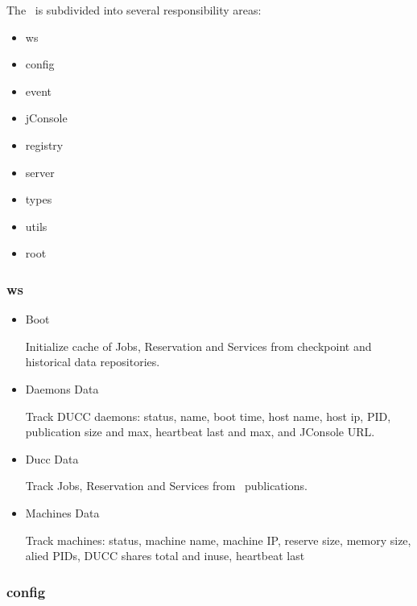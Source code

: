     The \varWebServer~is subdivided into several responsibility areas:

    \begin{itemize}
      \item ws
      \item config
      \item event
      \item jConsole
      \item registry
      \item server
      \item types
      \item utils
      \item root
    \end{itemize} 
    
    \subsubsection{ws}
    
    \begin{itemize}
      \item Boot
      \begin{description}
      Initialize cache of Jobs, Reservation and Services from checkpoint and historical data repositories.
      \end{description}
      \item Daemons Data
      \begin{description}
      Track DUCC daemons: status, name, boot time, host name, host ip, PID, publication size and max, heartbeat last and max, and JConsole URL.
      \end{description}
      \item Ducc Data
      \begin{description}
      Track Jobs, Reservation and Services from \varOrchestrator~publications.
      \end{description}
      \item Machines Data
     \begin{description}
      Track machines: status, machine name, machine IP, reserve size, memory size, alied PIDs, DUCC shares total and inuse, heartbeat last
      \end{description}
    \end{itemize} 
    
    \subsubsection{config}
         
